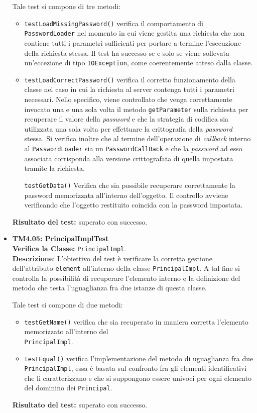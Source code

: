 \begin{itemize}
Tale test si compone di tre metodi:
\begin{itemize}

\item \texttt{testLoadMissingPassword()} verifica il comportamento di \texttt{PasswordLoader} nel momento in cui viene gestita una richiesta che non contiene tutti i parametri sufficienti per portare a termine l'esecuzione della richiesta stessa. Il test ha successo se e solo se viene sollevata un'eccezione di tipo \texttt{IOException}, come coerentemente atteso dalla classe.

\item \texttt{testLoadCorrectPassword()} verifica il corretto funzionamento della classe nel caso in cui la richiesta al server contenga tutti i parametri necessari. Nello specifico, viene controllato che venga correttamente invocato una e una sola volta il metodo \texttt{getParameter} sulla richiesta per recuperare il valore della \textit{password} e che la strategia di codifica sia utilizzata una sola volta per effettuare la crittografia della \textit{password} stessa. Si verifica inoltre che al termine dell'operazione di \textit{callback} interno al \texttt{PasswordLoader} sia un \texttt{PasswordCallBack} e che la \textit{password} ad esso associata corrisponda alla versione crittografata di quella impostata tramite la richiesta.

\texttt{testGetData()} Verifica che sia possibile recuperare correttamente la password memorizzata all'interno dell'oggetto.
Il controllo avviene verificando che l'oggetto restituito coincida con la password impostata.
 
\end{itemize}
\textbf{Risultato del test:} superato con successo.


\item \textbf{TM4.05: PrincipalImplTest}\\
\textbf{Verifica la Classe:} \texttt{PrincipalImpl}.\\
\textbf{Descrizione}: L'obiettivo del test è verificare la corretta gestione dell'attributo \texttt{element} all'interno della classe \texttt{PrincipalImpl}. A tal fine si controlla la possibilità di recuperare l'elemento interno e la definizione del metodo che testa l'uguaglianza fra due istanze di questa classe.

Tale test si compone di due metodi:
\begin{itemize}
\item \texttt{testGetName()} verifica che sia recuperato in maniera corretta l'elemento memorizzato all'interno del\\ \texttt{PrincipalImpl}.

\item \texttt{testEqual()} verifica l'implementazione del metodo di uguaglianza fra due \\ \texttt{PrincipalImpl}, essa è basata sul confronto fra gli elementi identificativi che li caratterizzano e che si suppongono essere univoci per ogni elemento del dominino dei \texttt{Principal}.
\end{itemize}
\textbf{Risultato del test:} superato con successo.

\end{itemize}

